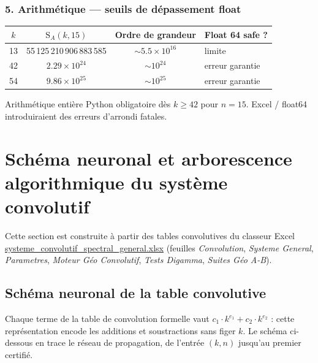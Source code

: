 \documentclass[11pt,a4paper]{article}
\newcommand{\SA}{\mathrm{S}_A}
\begin{document}
\subsubsection{5. Arithmétique --- seuils de dépassement float}

\begin{center}\small
\begin{tabular}{@{}c c c l@{}}
\toprule
\rowcolor{spectralgris}
$k$ & $\SA(k,15)$ & Ordre de grandeur & Float 64 safe ? \\
\midrule
13 & 55\,125\,210\,906\,883\,585 & $\sim 5.5\times 10^{16}$ & limite \\
42 & $2.29\times 10^{24}$ & $\sim 10^{24}$ & erreur garantie \\
54 & $9.86\times 10^{25}$ & $\sim 10^{25}$ & erreur garantie \\
\bottomrule
\end{tabular}
\end{center}

\begin{boitealerte}
Arithmétique entière Python obligatoire dès $k \ge 42$ pour $n = 15$.
Excel / float64 introduiraient des erreurs d'arrondi fatales.
\end{boitealerte}


\section{Schéma neuronal et arborescence algorithmique du système convolutif}

Cette section est construite à partir des tables convolutives du classeur Excel
\url{systeme_convolutif_spectral_general.xlsx} (feuilles
\emph{Convolution}, \emph{Systeme General}, \emph{Parametres},
\emph{Moteur Géo Convolutif}, \emph{Tests Digamma}, \emph{Suites Géo A-B}).

\subsection{Schéma neuronal de la table convolutive}

Chaque terme de la table de convolution formelle vaut $c_1 \cdot k^{e_1} +
c_2 \cdot k^{e_2}$ : cette représentation encode les additions et soustractions
sans figer $k$. Le schéma ci-dessous en trace le réseau de propagation, de
l'entrée $(k, n)$ jusqu'au premier certifié.
\end{document}
